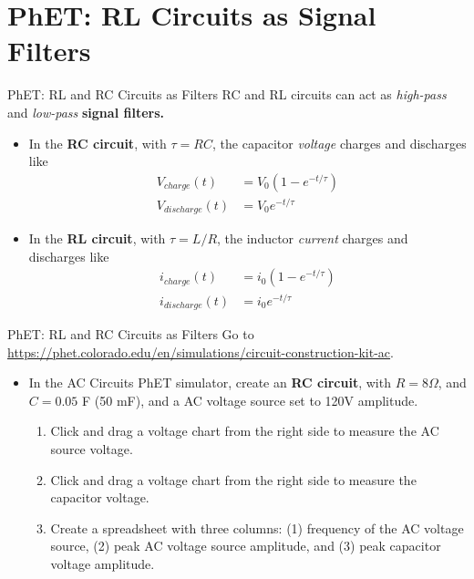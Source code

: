 \documentclass{beamer}
\begin{document}
\section{PhET: RL Circuits as Signal Filters}

\begin{frame}{PhET: RL and RC Circuits as Filters}
\small
RC and RL circuits can act as \textit{high-pass} and \textit{low-pass} \textbf{\alert{signal filters.}}
\begin{itemize}
\item In the \textbf{\alert{RC circuit}}, with $\tau = RC$, the capacitor \textit{voltage} charges and discharges like
\begin{align}
V_{charge}(t) &= V_0 \left(1 - e^{-t/\tau}\right) \\
V_{discharge}(t) &= V_0 e^{-t/\tau}
\end{align}
\item In the \textbf{\alert{RL circuit}}, with $\tau = L/R$, the inductor \textit{current} charges and discharges like
\begin{align}
i_{charge}(t) &= i_0 \left(1 - e^{-t/\tau}\right) \\
i_{discharge}(t) &= i_0 e^{-t/\tau}
\end{align}
\end{itemize}
\end{frame}

\begin{frame}{PhET: RL and RC Circuits as Filters}
\footnotesize
Go to \url{https://phet.colorado.edu/en/simulations/circuit-construction-kit-ac}.
\begin{itemize}
\footnotesize
\item In the AC Circuits PhET simulator, create an \textbf{\alert{RC circuit}}, with $R = 8 \Omega$, and $C = 0.05$ F (50 mF), and a AC voltage source set to 120V amplitude.
\begin{enumerate}
\footnotesize
\item Click and drag a voltage chart from the right side to measure the AC source voltage.
\item Click and drag a voltage chart from the right side to measure the capacitor voltage.
\item Create a spreadsheet with three columns: (1) frequency of the AC voltage source, (2) peak AC voltage source amplitude, and (3) peak capacitor voltage amplitude.
\end{enumerate}
\end{itemize}
\end{frame}
\end{document}
